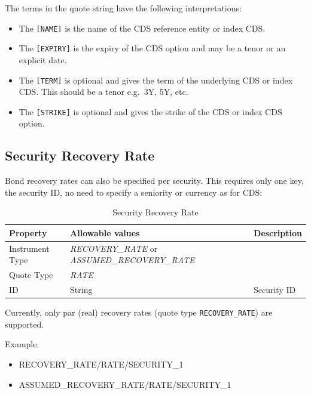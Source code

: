 The terms in the quote string have the following interpretations:
\begin{itemize}
\item The \lstinline![NAME]! is the name of the CDS reference entity or index CDS.
\item The \lstinline![EXPIRY]! is the expiry of the CDS option and may be a tenor or an explicit date.
\item The \lstinline![TERM]! is optional and gives the term of the underlying CDS or index CDS. This should be a tenor e.g.\ 3Y, 5Y, etc.
\item The \lstinline![STRIKE]! is optional and gives the strike of the CDS or index CDS option.
\end{itemize}


\subsection{Security Recovery Rate}\label{md:sec_rec_rates}

Bond recovery rates can also be specified per security. This requires only one key, the security ID, no need to specify a seniority or currency as for CDS:

\begin{table}[H]
\centering
  \begin{tabular}{|p{3cm}|p{3.5cm}|p{7cm}|}
    \hline
    {\bf Property} & {\bf Allowable values} & {\bf Description} \\ \hline
    Instrument Type & \emph{RECOVERY\_RATE} or \emph{ASSUMED\_RECOVERY\_RATE} & \\ \hline
    Quote Type & \emph{RATE} & \\ \hline
    ID & String &  Security ID \\ \hline
  \end{tabular}
  \caption{Security Recovery Rate}
  \label{tab:secrecrate_quote}
\end{table}

Currently, only par (real) recovery rates (quote type \lstinline!RECOVERY_RATE!) are supported.

Example:
\begin{itemize}
\item {RECOVERY\_RATE/RATE/SECURITY\_1}
\item {ASSUMED\_RECOVERY\_RATE/RATE/SECURITY\_1}
\end{itemize}

